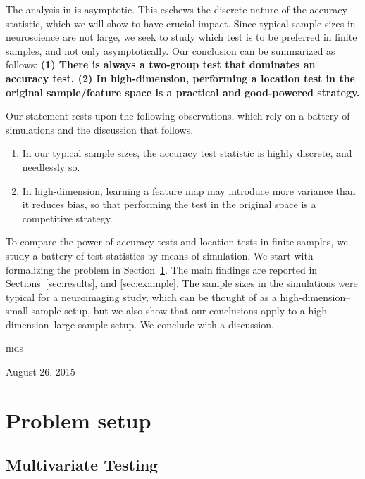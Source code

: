 \documentclass[journal]{IEEEtran}
\begin{document}
The analysis in \cite{ramdas_classification_2016} is asymptotic. 
This eschews the discrete nature of the accuracy statistic, which we will show to have  crucial impact. 
Since typical sample sizes in neuroscience are not large, we seek to study which test is to be preferred in finite samples, and not only asymptotically.
Our conclusion  can be summarized as follows:\newline \textbf{
	(1) There is always a two-group test that dominates an accuracy test.\newline
	(2) In high-dimension, performing a location test in the original sample/feature space is a practical and good-powered strategy.
}

Our statement rests upon the following observations, which rely on a battery of simulations and the discussion that follows.
\begin{enumerate}
	\item In our typical sample sizes, the accuracy test statistic is highly discrete, and needlessly so. 
	\item In high-dimension, learning a feature map may introduce more variance than it reduces bias, so that performing the test in the original space is a competitive strategy.
\end{enumerate}



To compare the power of accuracy tests and location tests in finite samples, we study a battery of test statistics by means of simulation. 
We start with formalizing the problem in Section~\ref{sec:problem_setup}.
The main findings are reported in Sections~\ref{sec:results}, and \ref{sec:example}.
The sample sizes in the simulations were typical for a neuroimaging study, which can be thought of as a high-dimension--small-sample setup, but we also show that our conclusions apply to a high-dimension--large-sample setup.
We conclude with a discussion.





\hfill mds

\hfill August 26, 2015



\section{Problem setup}
\label{sec:problem_setup}


\subsection{Multivariate Testing}
\end{document}
